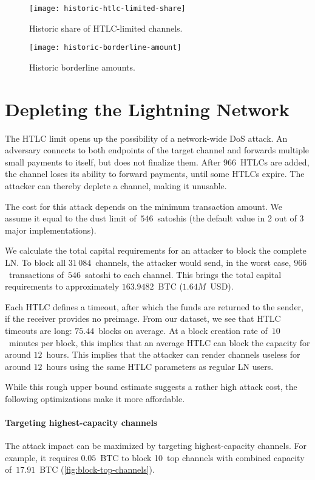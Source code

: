 \begin{figure}[tb]
	\centering
	\texttt{[image: historic-htlc-limited-share]}
	\caption{Historic share of HTLC-limited channels.}
	\label{fig:historic-htlc-limited-share}
\end{figure}

\begin{figure}[tb]
	\centering
	\texttt{[image: historic-borderline-amount]}
	\caption{Historic borderline amounts.}
	\label{fig:historic-borderline-amount}
\end{figure}


\section{Depleting the Lightning Network}

The HTLC limit opens up the possibility of a network-wide DoS attack.
An adversary connects to both endpoints of the target channel and forwards multiple small payments to itself, but does not finalize them.
After $966$~HTLCs are added, the channel loses its ability to forward payments, until some HTLCs expire.
The attacker can thereby deplete a channel, making it unusable.

The cost for this attack depends on the minimum transaction amount.
We assume it equal to the dust limit of~$546$~satoshis (the default value in 2 out of 3 major implementations).

We calculate the total capital requirements for an attacker to block the complete LN\@.
To block all $31\,084$~channels, the attacker would send, in the worst case, $966$~transactions of~$546$~satoshi to each channel.
This brings the total capital requirements to approximately $163.9482$~BTC ($1.64M$~USD).

Each HTLC defines a timeout, after which the funds are returned to the sender, if the receiver provides no preimage.
From our dataset, we see that HTLC timeouts are long: $75.44$~blocks on average.
At a block creation rate of~$10$~minutes per block, this implies that an average HTLC can block the capacity for around $12$~hours.
This implies that the attacker can render channels useless for around $12$~hours using the same HTLC parameters as regular LN users.

While this rough upper bound estimate suggests a rather high attack cost, the following optimizations make it more affordable.


\paragraph{Targeting highest-capacity channels}
The attack impact can be maximized by targeting highest-capacity channels.
For example, it requires $0.05$~BTC to block 10~top channels with combined capacity of~$17.91$~BTC (\cref{fig:block-top-channels}).

